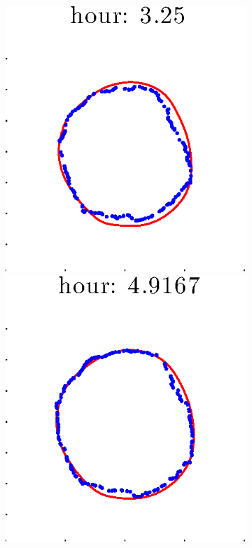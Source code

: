 \documentclass[12pt]{article}
\begin{document}
\begin{figure}[h!]
\begin{subfigure}[b]{.3\textwidth}
		\includegraphics[height=.15\textheight]{Pos0/full/full3.eps}
		\includegraphics[height=.15\textheight]{Pos0/full/full4.eps}

\end{subfigure}
\end{figure}
\end{document}

